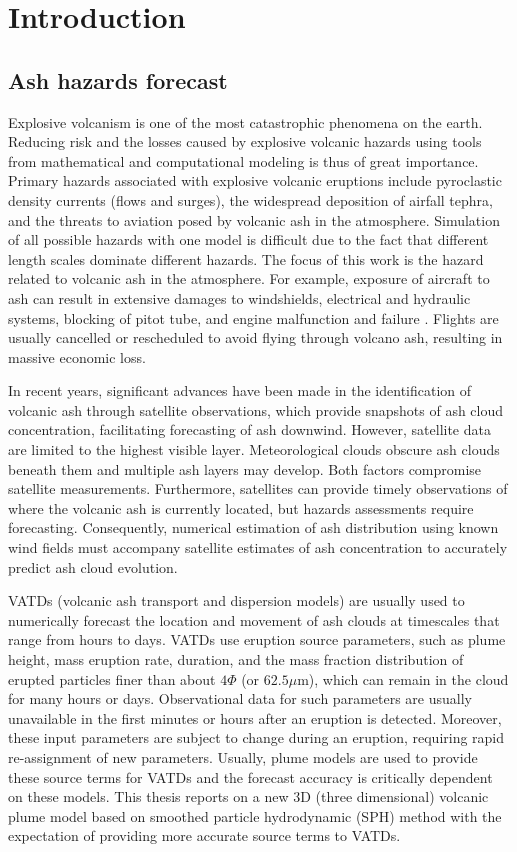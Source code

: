 \chapter{Introduction} \label{chapter:introduction}
\section{Ash hazards forecast}
Explosive volcanism is one of the most catastrophic
phenomena on the earth.
Reducing risk and the losses caused by explosive volcanic hazards using tools from mathematical and computational modeling is thus of great importance.
Primary hazards associated with explosive volcanic eruptions include pyroclastic density currents (flows and surges), the widespread deposition of airfall tephra, and the threats to aviation posed by volcanic ash in the atmosphere. Simulation of all possible hazards with one model is difficult due to the fact that different length scales dominate different hazards. The focus of this work is the hazard related to volcanic ash in the atmosphere. For example, exposure of aircraft to ash can result in extensive damages to windshields, electrical and hydraulic systems, blocking of pitot tube, and  engine malfunction and failure \citep{peterson2008forecasting}. Flights are usually cancelled or rescheduled to avoid flying through volcano ash, resulting in massive economic loss.

In recent years, significant advances have been made in the identification of volcanic ash through satellite observations, which provide snapshots of ash cloud concentration, facilitating forecasting of ash downwind.
However, satellite data are limited to the highest visible layer. Meteorological clouds obscure ash clouds beneath them and multiple ash layers may develop. Both factors compromise satellite measurements. Furthermore, satellites can provide timely observations of where the volcanic ash is currently located, but hazards assessments
require forecasting. Consequently, numerical estimation of ash distribution using known wind fields must accompany satellite estimates of ash concentration to accurately predict ash cloud evolution.

VATDs (volcanic ash transport and dispersion models) are usually used to numerically forecast the location and movement of ash clouds at timescales that range from hours to days. VATDs use eruption source parameters, such as plume height, mass eruption rate, duration, and the mass fraction distribution of erupted particles finer than about $4 \Phi$ (or $62.5 \mu$m), which can remain in the cloud for many hours or days. Observational data for such parameters are usually unavailable in the first minutes or hours after an eruption is detected. Moreover, these input parameters are subject to change during an eruption, requiring rapid re-assignment of new parameters. Usually, plume models are used to provide these source terms for VATDs and the forecast accuracy is critically dependent on these models. This thesis reports on a new 3D (three dimensional) volcanic plume model based on smoothed particle hydrodynamic (SPH) method with the expectation of providing more accurate source terms to VATDs.

